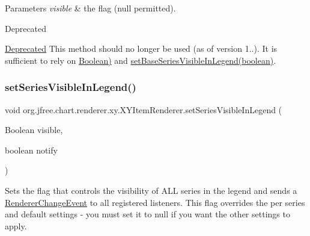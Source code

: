 \begin{DoxyParams}{Parameters}
{\em visible} & the flag ({\ttfamily null} permitted).\\
\hline
\end{DoxyParams}
\begin{DoxyRefDesc}{Deprecated}
\item[\mbox{\hyperlink{deprecated__deprecated000217}{Deprecated}}]This method should no longer be used (as of version 1..). It is sufficient to rely on \mbox{\hyperlink{}{Boolean)}} and \mbox{\hyperlink{interfaceorg_1_1jfree_1_1chart_1_1renderer_1_1xy_1_1_x_y_item_renderer_ada7d9dbe2c39453f0f453cb569f63dde}{set\+Base\+Series\+Visible\+In\+Legend(boolean)}}. \end{DoxyRefDesc}
\mbox{\label{interfaceorg_1_1jfree_1_1chart_1_1renderer_1_1xy_1_1_x_y_item_renderer_a8cae5bf5b3e5f01e3bc84360b693f9a4}} 
\subsubsection{\texorpdfstring{set\+Series\+Visible\+In\+Legend()}{setSeriesVisibleInLegend()}\hspace{0.1cm}{\footnotesize\ttfamily [4/4]}}
{\footnotesize\ttfamily void org.\+jfree.\+chart.\+renderer.\+xy.\+X\+Y\+Item\+Renderer.\+set\+Series\+Visible\+In\+Legend (\begin{DoxyParamCaption}\item[{Boolean}]{visible,  }\item[{boolean}]{notify }\end{DoxyParamCaption})}

Sets the flag that controls the visibility of A\+LL series in the legend and sends a \mbox{\hyperlink{}{Renderer\+Change\+Event}} to all registered listeners. This flag overrides the per series and default settings -\/ you must set it to {\ttfamily null} if you want the other settings to apply.



